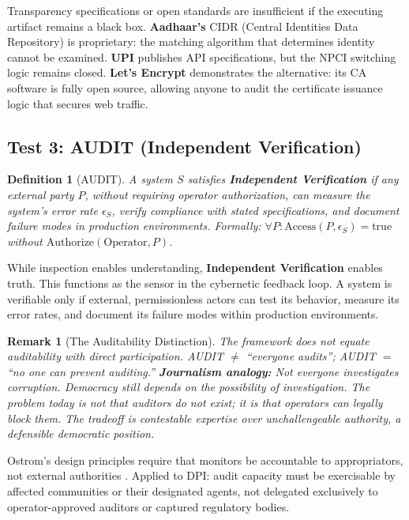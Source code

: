\documentclass{article}
\newtheorem{definition}{Definition}[section]
\newtheorem{remark}{Remark}[section]
\begin{document}
Transparency specifications or open standards are insufficient if the executing artifact remains a black box. \textbf{Aadhaar's} CIDR (Central Identities Data Repository) is proprietary: the matching algorithm that determines identity cannot be examined. \textbf{UPI} publishes API specifications, but the NPCI switching logic remains closed. \textbf{Let's Encrypt} demonstrates the alternative: its CA software is fully open source, allowing anyone to audit the certificate issuance logic that secures web traffic.

\subsection{Test 3: AUDIT (Independent Verification)}

\begin{definition}[AUDIT]
\label{def:audit}
A system $S$ satisfies \textbf{Independent Verification} if any external party $P$, without requiring operator authorization, can measure the system's error rate $\epsilon_S$, verify compliance with stated specifications, and document failure modes in production environments. Formally: $\forall P: \text{Access}(P, \epsilon_S) = \text{true}$ without $\text{Authorize}(\text{Operator}, P)$.
\end{definition}

While inspection enables understanding, \textbf{Independent Verification} enables truth. This functions as the sensor in the cybernetic feedback loop. A system is verifiable only if external, permissionless actors can test its behavior, measure its error rates, and document its failure modes within production environments.

\begin{remark}[The Auditability Distinction]
The framework does not equate auditability with direct participation. AUDIT $\neq$ ``everyone audits''; AUDIT $=$ ``no one can prevent auditing.'' \textbf{Journalism analogy:} Not everyone investigates corruption. Democracy still depends on the \textit{possibility} of investigation. The problem today is not that auditors do not exist; it is that operators can legally block them. The tradeoff is contestable expertise over unchallengeable authority, a defensible democratic position.
\end{remark}

Ostrom's design principles require that monitors be accountable to appropriators, not external authorities \citep{ostrom1990}. Applied to DPI: audit capacity must be exercisable by affected communities or their designated agents, not delegated exclusively to operator-approved auditors or captured regulatory bodies.
\end{document}
